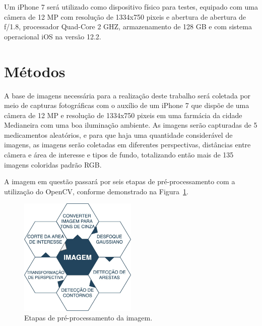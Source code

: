 Um iPhone 7 será utilizado como dispositivo físico  para testes, equipado com uma câmera de 12 MP com resolução de 1334x750 pixeis e abertura de abertura de ƒ/1.8, processador Quad-Core 2 GHZ, armazenamento de 128 GB e com sistema operacional iOS na versão 12.2.


\section{Métodos}
A base de imagens necessária para a realização deste trabalho será coletada por meio de capturas fotográficas com o auxílio de um iPhone 7 que dispõe de uma câmera de 12 MP e resolução de 1334x750 pixeis em uma farmácia da cidade Medianeira com uma boa iluminação ambiente. As imagens serão capturadas de 5 medicamentos aleatórios, e para que haja uma quantidade considerável de imagens, as imagens serão coletadas em diferentes perspectivas, distâncias entre câmera e área de interesse e tipos de fundo, totalizando então mais de 135 imagens coloridas padrão RGB.

A imagem em questão passará por seis etapas de pré-processamento com a utilização do OpenCV, conforme demonstrado na Figura~\ref{fig:diagrama}.

\begin{figure}[h!]
	\centering
	
	\includegraphics[width=0.5\textwidth]{Imagens/diagrama} 
	\caption[Etapas de pré-processamento da imagem.]{Etapas de pré-processamento da imagem.}
	\label{fig:diagrama}
\end{figure}

